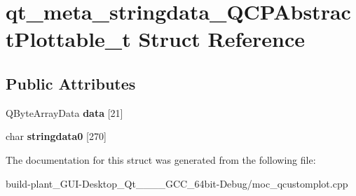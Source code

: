\hypertarget{structqt__meta__stringdata__QCPAbstractPlottable__t}{}\section{qt\+\_\+meta\+\_\+stringdata\+\_\+\+Q\+C\+P\+Abstract\+Plottable\+\_\+t Struct Reference}
\label{structqt__meta__stringdata__QCPAbstractPlottable__t}
\subsection*{Public Attributes}
\begin{DoxyCompactItemize}
\item 
\mbox{\label{structqt__meta__stringdata__QCPAbstractPlottable__t_aaf0620f4cc407349bff54eddf41fef33}} 
Q\+Byte\+Array\+Data {\bfseries data} \mbox{[}21\mbox{]}
\item 
\mbox{\label{structqt__meta__stringdata__QCPAbstractPlottable__t_a397cb51ceb93b62e1fb7a828768255e4}} 
char {\bfseries stringdata0} \mbox{[}270\mbox{]}
\end{DoxyCompactItemize}


The documentation for this struct was generated from the following file\+:\begin{DoxyCompactItemize}
\item 
build-\/plant\+\_\+\+G\+U\+I-\/\+Desktop\+\_\+\+Qt\+\_\+\_\+\_\+\_\+\+G\+C\+C\+\_\+64bit-\/\+Debug/moc\+\_\+qcustomplot.\+cpp\end{DoxyCompactItemize}
